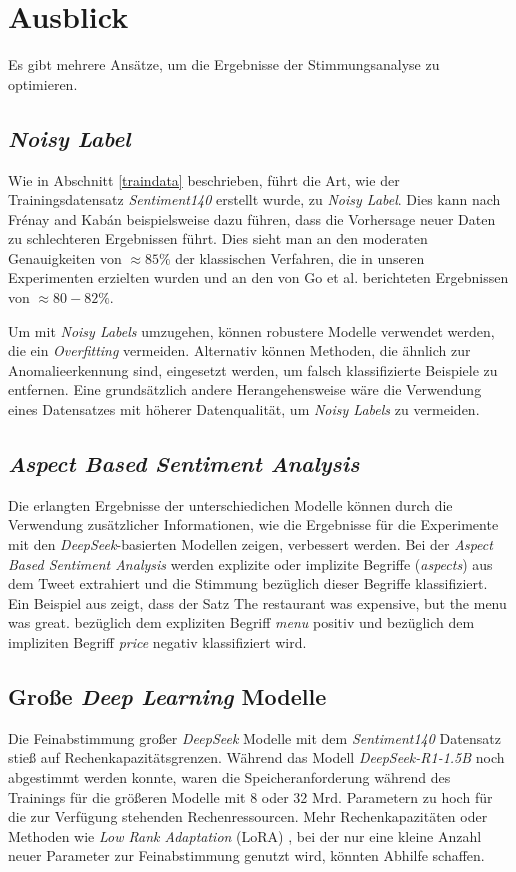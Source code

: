 \section{Ausblick}\label{sec:ausblick}

Es gibt mehrere Ansätze, um die Ergebnisse der Stimmungsanalyse zu optimieren.

\subsection{\textit{Noisy Label}}
Wie in Abschnitt \ref{traindata} beschrieben, führt die Art, wie der Trainingsdatensatz \textit{Sentiment140} erstellt wurde, zu \textit{Noisy Label}.
Dies kann nach Fr{\'e}nay and Kab{\'a}n \cite{NoisyLabel2014} beispielsweise dazu führen, dass die Vorhersage neuer Daten zu schlechteren Ergebnissen führt.
Dies sieht man an den moderaten Genauigkeiten von $\approx{85}\%$ der klassischen Verfahren, die in unseren Experimenten erzielten wurden und an den von Go et al. \cite{go2009twitter} berichteten Ergebnissen von $\approx{80-82}\%$.

Um mit \textit{Noisy Labels} umzugehen, können robustere Modelle verwendet werden, die ein \textit{Overfitting} vermeiden.
Alternativ können Methoden, die ähnlich zur Anomalieerkennung sind, eingesetzt werden, um falsch klassifizierte Beispiele zu entfernen.
Eine grundsätzlich andere Herangehensweise wäre die Verwendung eines Datensatzes mit höherer Datenqualität, um \textit{Noisy Labels} zu vermeiden.

\subsection{\textit{Aspect Based Sentiment Analysis}}

Die erlangten Ergebnisse der unterschiedichen Modelle können durch die Verwendung zusätzlicher Informationen, wie die Ergebnisse für die Experimente mit den \textit{DeepSeek}-basierten Modellen zeigen, verbessert werden.
Bei der \textit{Aspect Based Sentiment Analysis} werden explizite oder implizite Begriffe (\textit{aspects}) aus dem Tweet extrahiert und die Stimmung bezüglich dieser Begriffe klassifiziert.
Ein Beispiel aus \cite{Hua_2024} zeigt, dass der Satz \glqq The restaurant was expensive, but the menu was great.\grqq{} bezüglich dem expliziten Begriff \textit{menu} positiv und bezüglich dem impliziten Begriff \textit{price} negativ klassifiziert wird.

\subsection{Große \textit{Deep Learning} Modelle}

Die Feinabstimmung großer \textit{DeepSeek} Modelle mit dem \textit{Sentiment140} Datensatz stieß auf Rechenkapazitätsgrenzen.
Während das Modell \textit{DeepSeek-R1-1.5B} noch abgestimmt werden konnte, waren die Speicheranforderung während des Trainings für die größeren Modelle mit 8 oder 32 Mrd. Parametern zu hoch für die zur Verfügung stehenden Rechenressourcen.
Mehr Rechenkapazitäten oder Methoden wie \textit{Low Rank Adaptation} (LoRA) \cite{lora2021}, bei der nur eine kleine Anzahl neuer Parameter zur Feinabstimmung genutzt wird, könnten Abhilfe schaffen.
